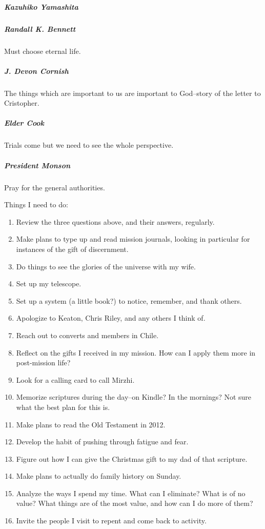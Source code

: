 \subparagraph*{Kazuhiko Yamashita}

\subparagraph*{Randall K. Bennett} Must choose eternal life.

\subparagraph*{J. Devon Cornish} The things which are important to us are important to God--story of the letter to Cristopher.

\subparagraph*{Elder Cook} Trials come but we need to see the whole perspective.

\subparagraph*{President Monson} Pray for the general authorities.

Things I need to do:

\begin{enumerate}
\item Review the three questions above, and their answers, regularly.
\item Make plans to type up and read mission journals, looking in particular for instances of the gift of discernment.
\item Do things to see the glories of the universe with my wife.
\item Set up my telescope.
\item Set up a system (a little book?) to notice, remember, and thank others.
\item Apologize to Keaton, Chris Riley, and any others I think of.
\item Reach out to converts and members in Chile.
\item Reflect on the gifts I received in my mission. How can I apply them more in post-mission life?
\item Look for a calling card to call Mirzhi.
\item Memorize scriptures during the day--on Kindle? In the mornings? Not sure what the best plan for this is.
\item Make plans to read the Old Testament in 2012.
\item Develop the habit of pushing through fatigue and fear.
\item Figure out how I can give the Christmas gift to my dad of that scripture.
\item Make plans to actually do family history on Sunday.
\item Analyze the ways I spend my time. What can I eliminate? What is of no value? What things are of the most value, and how can I do more of them?
\item Invite the people I visit to repent and come back to activity.
\end{enumerate}
